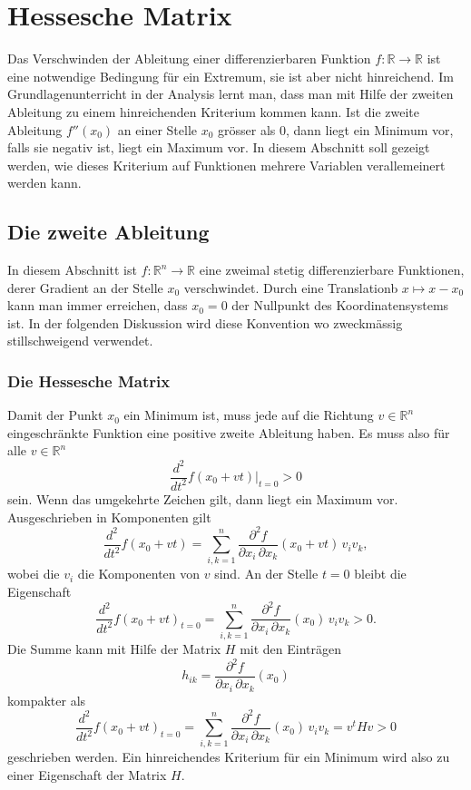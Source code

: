 %
%
%
\section{Hessesche Matrix
\label{buch:fuvar:section:hessesche}}
Das Verschwinden der Ableitung einer differenzierbaren Funktion
$f\colon\mathbb{R}\to\mathbb{R}$ ist eine notwendige Bedingung
für ein Extremum, sie ist aber nicht hinreichend.
Im Grundlagenunterricht in der Analysis lernt man, dass man mit
Hilfe der zweiten Ableitung zu einem hinreichenden Kriterium
kommen kann.
Ist die zweite Ableitung $f''(x_0)$ an einer Stelle $x_0$ grösser
als $0$, dann liegt ein Minimum vor, falls sie negativ ist, liegt
ein Maximum vor.
In diesem Abschnitt soll gezeigt werden, wie dieses Kriterium auf
Funktionen mehrere Variablen verallemeinert werden kann.

%
%
\subsection{Die zweite Ableitung}
In diesem Abschnitt ist $f\colon\mathbb{R}^n\to\mathbb{R}$
eine zweimal stetig differenzierbare Funktionen, derer Gradient
an der Stelle $x_0$ verschwindet.
Durch eine Translationb $x\mapsto x-x_0$ kann man immer erreichen,
dass $x_0=0$ der Nullpunkt des Koordinatensystems ist.
In der folgenden Diskussion wird diese Konvention wo zweckmässig
stillschweigend verwendet.

%
%
\subsubsection{Die Hessesche Matrix}
Damit der Punkt $x_0$ ein Minimum ist, muss jede auf die Richtung
$v\in\mathbb{R}^n$ eingeschränkte Funktion eine positive zweite
Ableitung haben.
Es muss also für alle $v\in\mathbb{R}^n$
\[
\frac{d^2}{dt^2} f(x_0+vt)\bigg|_{t=0}
> 0
\]
sein.
Wenn das umgekehrte Zeichen gilt, dann liegt ein Maximum vor.
Ausgeschrieben in Komponenten gilt
\[
\frac{d^2}{dt^2} f(x_0+vt)
=
\sum_{i,k=1}^n
\frac{\partial^2 f}{\partial x_i\,\partial x_k}(x_0+vt)
\,
v_iv_k,
\]
wobei die $v_i$ die Komponenten von $v$ sind.
An der Stelle $t=0$ bleibt die Eigenschaft
\[
\frac{d^2}{dt^2}f(x_0+vt)_{t=0}
=
\sum_{i,k=1}^n \frac{\partial^2 f}{\partial x_i\,\partial x_k}(x_0) \,v_iv_k
>
0.
\]
Die Summe kann mit Hilfe der Matrix $H$ mit den Einträgen
\[
h_{ik}
=
\frac{\partial^2 f}{\partial x_i\,\partial x_k}(x_0)
\]
kompakter als
\[
\frac{d^2}{dt^2}f(x_0+vt)_{t=0}
=
\sum_{i,k=1}^n \frac{\partial^2 f}{\partial x_i\,\partial x_k}(x_0) \,v_iv_k
=
v^tHv
>
0
\]
geschrieben werden.
Ein hinreichendes Kriterium für ein Minimum wird also zu einer
Eigenschaft der Matrix $H$.


